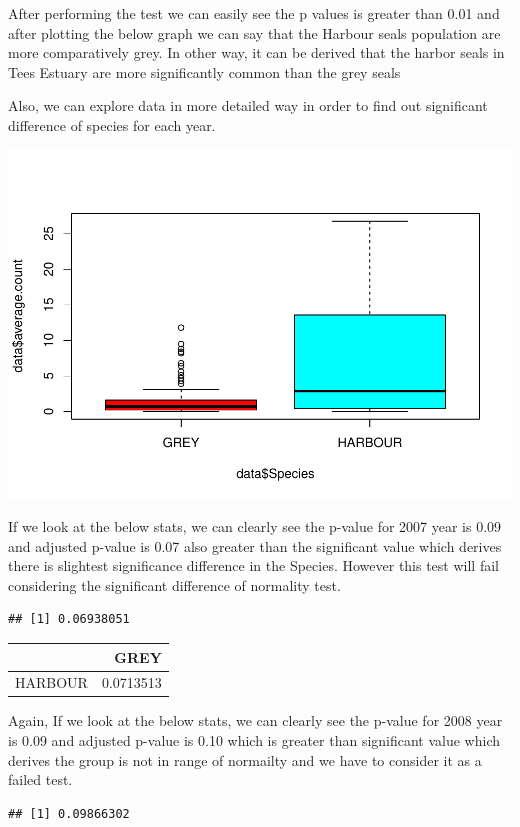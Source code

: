 \documentclass[
]{article}
\begin{document}
After performing the test we can easily see the p values is greater than
0.01 and after plotting the below graph we can say that the Harbour
seals population are more comparatively grey. In other way, it can be
derived that the harbor seals in Tees Estuary are more significantly
common than the grey seals

Also, we can explore data in more detailed way in order to find out
significant difference of species for each year.

\includegraphics{Statistical-analysis-in-RStudio_files/figure-latex/unnamed-chunk-22-1.pdf}

If we look at the below stats, we can clearly see the p-value for 2007
year is 0.09 and adjusted p-value is 0.07 also greater than the
significant value which derives there is slightest significance
difference in the Species. However this test will fail considering the
significant difference of normality test.

\begin{verbatim}
## [1] 0.06938051
\end{verbatim}

\begin{longtable}[]{@{}lr@{}}
\toprule
& GREY\tabularnewline
\midrule
\endhead
HARBOUR & 0.0713513\tabularnewline
\bottomrule
\end{longtable}

Again, If we look at the below stats, we can clearly see the p-value for
2008 year is 0.09 and adjusted p-value is 0.10 which is greater than
significant value which derives the group is not in range of normailty
and we have to consider it as a failed test.

\begin{verbatim}
## [1] 0.09866302
\end{verbatim}
\end{document}
